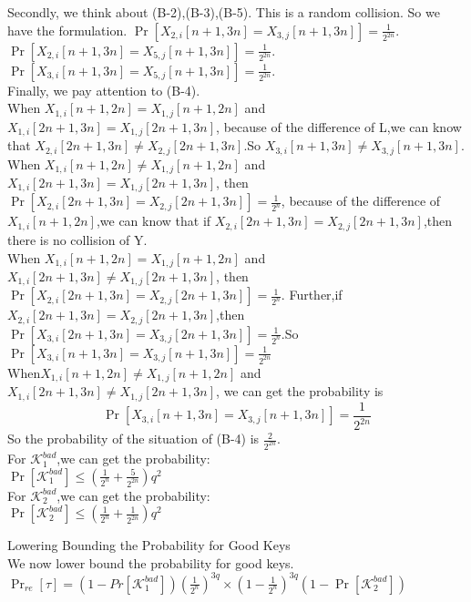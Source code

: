 \documentclass{article}
\begin{document}
Secondly, we think about (B-2),(B-3),(B-5). This is a random collision.
So we have the formulation.
$\Pr[X_{2,i}[n+1,3n]=X_{3,j}[n+1,3n]]=\frac{1}{2^{2n}}$.\\
$\Pr[X_{2,i}[n+1,3n]=X_{5,j}[n+1,3n]]=\frac{1}{2^{2n}}$.\\
$\Pr[X_{3,i}[n+1,3n]=X_{5,j}[n+1,3n]]=\frac{1}{2^{2n}}$.\\

Finally, we pay attention to (B-4).\\
When $X_{1,i}[n+1,2n]=X_{1,j}[n+1,2n]$ and $X_{1,i}[2n+1,3n]=X_{1,j}[2n+1,3n]$, because of the difference of L,we can know that $X_{2,i}[2n+1,3n]\neq X_{2,j}[2n+1,3n]$.So $X_{3,i}[n+1,3n]\neq X_{3,j}[n+1,3n]$. \\
When $X_{1,i}[n+1,2n]\neq X_{1,j}[n+1,2n]$ and $X_{1,i}[2n+1,3n]=X_{1,j}[2n+1,3n]$, then $\Pr[X_{2,i}[2n+1,3n]=X_{2,j}[2n+1,3n]]=\frac{1}{2^{n}}$, because of the difference of $X_{1,i}[n+1,2n]$,we can know that if $X_{2,i}[2n+1,3n]=X_{2,j}[2n+1,3n]$,then there is no collision of Y.\\
When $X_{1,i}[n+1,2n]=X_{1,j}[n+1,2n]$ and $X_{1,i}[2n+1,3n]\neq X_{1,j}[2n+1,3n]$, then $\Pr[X_{2,i}[2n+1,3n]=X_{2,j}[2n+1,3n]]=\frac{1}{2^{n}}$. Further,if $X_{2,i}[2n+1,3n]=X_{2,j}[2n+1,3n]$,then $\Pr[X_{3,i}[2n+1,3n]=X_{3,j}[2n+1,3n]]=\frac{1}{2^{n}}$.So $\Pr[X_{3,i}[n+1,3n]=X_{3,j}[n+1,3n]]=\frac{1}{2^{2n}}$\\
When$X_{1,i}[n+1,2n]\neq X_{1,j}[n+1,2n]$ and $X_{1,i}[2n+1,3n]\neq X_{1,j}[2n+1,3n]$, we can get the probability is $$\Pr[X_{3,i}[n+1,3n]=X_{3,j}[n+1,3n]]=\frac{1}{2^{2n}}$$
So the probability of the situation of (B-4) is $\frac{2}{2^{2n}}$.\\
For $\mathcal{K}_{1}^{bad}$,we can get the probability:\\
$\Pr[\mathcal{K}_{1}^{bad}]\leq (\frac{1}{2^{n}}+\frac{5}{2^{2n}})q^{2}$\\

For $\mathcal{K}_{2}^{bad}$,we can get the probability:\\
$\Pr[\mathcal{K}_{2}^{bad}]\leq (\frac{1}{2^{n}}+\frac{1}{2^{2n}})q^{2}$

Lowering Bounding the Probability for Good Keys\\
We now lower bound the probability for good keys.\\
$\Pr_{re}[\tau]=(1-Pr[\mathcal{K}_{1}^{bad}])(\frac{1}{2^{n}})^{3q}\times(1-\frac{1}{2^{n}})^{3q}
(1-\Pr[\mathcal{K}_{2}^{bad}])$
\end{document}
